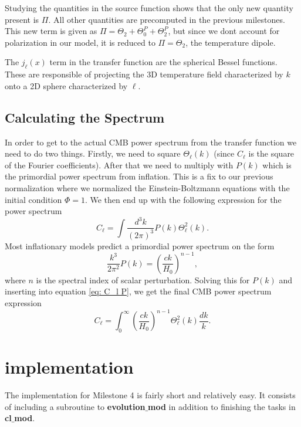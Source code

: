 \documentclass[a4paper, 10pt, reqno]{amsart}
\begin{document}
Studying the quantities in the source function shows that the only new quantity present is $\Pi$. All other quantities are precomputed in the previous milestones. This new term is given as $\Pi = \Theta_2 + \Theta_0^P + \Theta_2^P$, but since we dont account for polarization in our model, it is reduced to $\Pi = \Theta_2$, the temperature dipole. 

The $j_{\ell}(x)$ term in the transfer function are the spherical Bessel functions. These are responsible of projecting the 3D temperature field characterized by $k$ onto a 2D sphere characterized by $\ell$.

\subsection{Calculating the Spectrum}
In order to get to the actual CMB power spectrum from the transfer function we need to do two things. Firstly, we need to square $\Theta_\ell(k)$ (since $C_\ell$ is the square of the Fourier coefficients). After that we need to multiply with $P(k)$ which is the primordial power spectrum from inflation. This is a fix to our previous normalization where we normalized the Einstein-Boltzmann equations with the initial condition $\Phi = 1$. We then end up with the following expression for the power spectrum
\begin{equation}\label{eq: C_l P}
    C_{\ell}=\int \frac{d^{3} k}{(2 \pi)^{3}} P(k) \Theta_{\ell}^{2}(k).
\end{equation}
Most inflationary models predict a primordial power spectrum on the form
\begin{equation}
\frac{k^{3}}{2 \pi^{2}} P(k)=\left(\frac{c k}{H_{0}}\right)^{n-1},
\end{equation}
where $n$ is the spectral index of scalar perturbation. Solving this for $P(k)$ and inserting into equation \eqref{eq: C_l P}, we get the final CMB power spectrum expression 
\begin{equation}
    C_{\ell}=\int_{0}^{\infty}\left(\frac{c k}{H_{0}}\right)^{n-1} \Theta_{\ell}^{2}(k) \frac{d k}{k}.
\end{equation}

\section{implementation}
The implementation for Milestone 4 is fairly short and relatively easy. It consists of including a subroutine to \textbf{evolution$\_$mod} in addition to finishing the tasks in \textbf{cl$\_$mod}.
\end{document}
